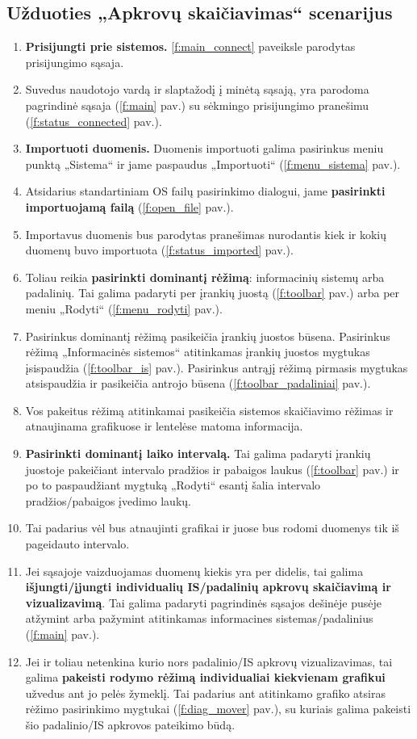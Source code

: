 \subsection{Užduoties „Apkrovų skaičiavimas“ scenarijus}

\newcommand{\ri}[1]{(\ref{#1} pav.)}

\begin{enumerate}
  \item \textbf{Prisijungti prie sistemos.} \ref{f:main_connect} paveiksle 
    parodytas prisijungimo sąsaja.
  \item Suvedus naudotojo vardą ir slaptažodį į minėtą sąsają,
    yra parodoma pagrindinė sąsaja \ri{f:main} su sėkmingo 
    prisijungimo pranešimu \ri{f:status_connected}.
  \item \textbf{Importuoti duomenis.} Duomenis importuoti galima
    pasirinkus meniu punktą „Sistema“ ir jame paspaudus
    „Importuoti“ \ri{f:menu_sistema}.
  \item Atsidarius standartiniam OS failų pasirinkimo dialogui, jame
    \textbf{pasirinkti importuojamą failą} \ri{f:open_file}.
  \item Importavus duomenis bus parodytas pranešimas nurodantis kiek ir
    kokių duomenų buvo importuota \ri{f:status_imported}.
  \item Toliau reikia \textbf{pasirinkti dominantį rėžimą}:
    informacinių sistemų arba padalinių. Tai galima padaryti per
    įrankių juostą \ri{f:toolbar} arba per meniu „Rodyti“
    \ri{f:menu_rodyti}.
  \item Pasirinkus dominantį rėžimą pasikeičia įrankių juostos
    būsena. Pasirinkus rėžimą „Informacinės sistemos“ atitinkamas
    įrankių juostos mygtukas įsispaudžia \ri{f:toolbar_is}. Pasirinkus
    antrąjį rėžimą pirmasis mygtukas atsispaudžia ir pasikeičia
    antrojo būsena \ri{f:toolbar_padaliniai}.
  \item Vos pakeitus rėžimą atitinkamai pasikeičia sistemos
    skaičiavimo rėžimas ir atnaujinama grafikuose ir lentelėse matoma
    informacija.
  \item \textbf{Pasirinkti dominantį laiko intervalą.} Tai galima
    padaryti įrankių juostoje pakeičiant intervalo pradžios ir pabaigos
    laukus \ri{f:toolbar} ir po to paspaudžiant mygtuką „Rodyti“
    esantį šalia intervalo pradžios/pabaigos įvedimo laukų.
  \item Tai padarius vėl bus atnaujinti grafikai ir juose bus rodomi
    duomenys tik iš pageidauto intervalo.
  \item Jei sąsajoje vaizduojamas duomenų kiekis yra per didelis, tai
    galima \textbf{išjungti/įjungti individualių IS/padalinių apkrovų
    skaičiavimą ir vizualizavimą}. Tai galima padaryti pagrindinės
    sąsajos dešinėje pusėje atžymint arba pažymint atitinkamas
    informacines sistemas/padalinius \ri{f:main}.
  \item Jei ir toliau netenkina kurio nors padalinio/IS apkrovų
    vizualizavimas, tai galima \textbf{pakeisti rodymo rėžimą
    individualiai kiekvienam grafikui} užvedus ant jo pelės žymeklį.
    Tai padarius ant atitinkamo grafiko atsiras rėžimo pasirinkimo
    mygtukai \ri{f:diag_mover}, su kuriais galima pakeisti šio
    padalinio/IS apkrovos pateikimo būdą.
\end{enumerate}
